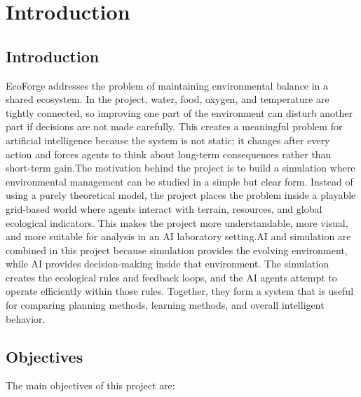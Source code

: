 \documentclass[12pt,a4paper]{article}
\begin{document}
\clearpage
\tableofcontents

\clearpage
\setcounter{section}{1}
\section{Introduction}

\subsection{Introduction}

EcoForge addresses the problem of maintaining environmental balance in a shared ecosystem. In the project, water, food, oxygen, and temperature are tightly connected, so improving one part of the environment can disturb another part if decisions are not made carefully. This creates a meaningful problem for artificial intelligence because the system is not static; it changes after every action and forces agents to think about long-term consequences rather than short-term gain.The motivation behind the project is to build a simulation where environmental management can be studied in a simple but clear form. Instead of using a purely theoretical model, the project places the problem inside a playable grid-based world where agents interact with terrain, resources, and global ecological indicators. This makes the project more understandable, more visual, and more suitable for analysis in an AI laboratory setting.AI and simulation are combined in this project because simulation provides the evolving environment, while AI provides decision-making inside that environment. The simulation creates the ecological rules and feedback loops, and the AI agents attempt to operate efficiently within those rules. Together, they form a system that is useful for comparing planning methods, learning methods, and overall intelligent behavior.

\subsection{Objectives}

The main objectives of this project are:
\end{document}
